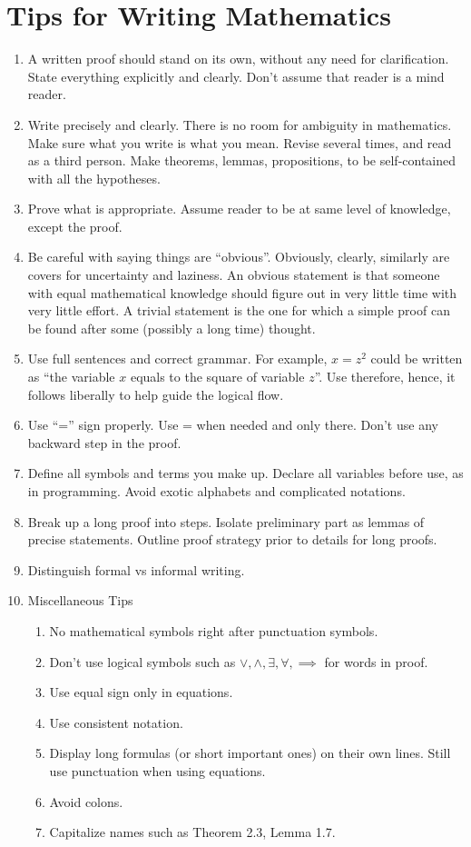 \documentclass[a4paper,english,12pt]{article}
\begin{document}
\section{Tips for Writing Mathematics}
\begin{enumerate}
 \item A written proof should stand on its own, without any need for clarification. State everything explicitly and clearly. Don't assume that reader is a mind reader.

 \item Write precisely and clearly. There is no room for ambiguity in mathematics. Make sure what you write is what you mean. Revise several times, and read as a third person. Make theorems, lemmas, propositions, to be self-contained with all the hypotheses.
 \item Prove what is appropriate. Assume reader to be at same level of knowledge, except the proof.
 \item Be careful with saying things are ``obvious''.  Obviously, clearly, similarly are covers for uncertainty and laziness. An obvious statement is that someone with equal mathematical knowledge should figure out in very little time with very little effort. A trivial statement is the one for which a simple proof can be found after some (possibly a long time) thought.
 \item Use full sentences and correct grammar. For example, $x=z^2$ could be written as ``the variable $x$ equals to the square of variable $z$''. Use therefore, hence, it follows liberally to help guide the logical flow.
 \item Use ``='' sign properly. Use = when needed and only there. Don't use any backward step in the proof.
 \item Define all symbols and terms you make up. Declare all variables before use, as in programming. Avoid exotic alphabets and complicated notations.
 \item Break up a long proof into steps. Isolate preliminary part as lemmas of precise statements. Outline proof strategy prior to details for long proofs. 
 \item Distinguish formal vs informal writing.
 \item Miscellaneous Tips
 \begin{enumerate}
  \item No mathematical symbols right after punctuation symbols.
  \item Don't use logical symbols such as $\vee, \wedge,\exists, \forall, \implies $ for words in proof.
  \item Use equal sign only in equations.
  \item Use consistent notation.
  \item Display long formulas (or short important ones) on their own lines. Still use punctuation when using equations.
  \item Avoid colons.
  \item Capitalize names such as Theorem 2.3, Lemma 1.7.  
 \end{enumerate}
\end{enumerate}
\end{document}
